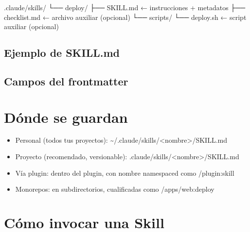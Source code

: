 \documentclass[11pt,a4paper]{book}
\begin{document}
\begin{codebox}
.claude/skills/
└── deploy/
    ├── SKILL.md          ← instrucciones + metadatos
    ├── checklist.md      ← archivo auxiliar (opcional)
    └── scripts/
        └── deploy.sh     ← script auxiliar (opcional)
\end{codebox}
\subsection{Ejemplo de SKILL.md}
\subsection{Campos del frontmatter}
\section{Dónde se guardan}
\begin{itemize}\item Personal (todos tus proyectos): \textasciitilde{}/.claude/skills/<nombre>/SKILL.md\end{itemize}
\begin{itemize}\item Proyecto (recomendado, versionable): .claude/skills/<nombre>/SKILL.md\end{itemize}
\begin{itemize}\item Vía plugin: dentro del plugin, con nombre namespaced como /plugin:skill\end{itemize}
\begin{itemize}\item Monorepos: en subdirectorios, cualificadas como /apps/web:deploy\end{itemize}
\section{Cómo invocar una Skill}
\end{document}
